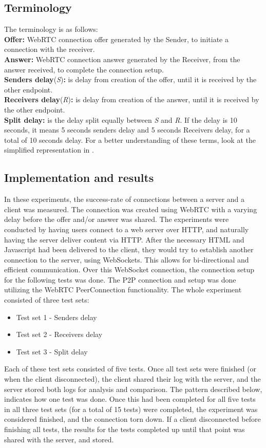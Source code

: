 \subsection{Terminology}
%
The terminology is as follows:\\
{\bfseries Offer:} WebRTC connection offer generated by the Sender, to initiate a connection with the receiver.\\
{\bfseries Answer:} WebRTC connection answer generated by the Receiver, from the answer received, to complete the connection setup.\\
{\bfseries Senders delay}(\textit{S}){\bfseries :} is delay from creation of the offer, until it is received by the other endpoint.\\
{\bfseries Receivers delay}(\textit{R}){\bfseries :} is delay from creation of the answer, until it is received by the other endpoint.\\
{\bfseries Split delay:} is the delay split equally between \textit{S} and \textit{R}. If the delay is 10 seconds, it means 5 seconds senders delay and 5 seconds Receivers delay, for a total of 10 seconds delay.
For a better understanding of these terms, look at the simplified representation in .
%
%
\subsection{Implementation and results}
In these experiments, the success-rate of connections between a server and a client was measured. The connection was created using WebRTC with a varying delay before the offer and/or answer was shared. The experiments were conducted by having users connect to a web server over HTTP, and naturally having the server deliver content via HTTP. After the necessary HTML and Javascript had been delivered to the client, they would try to establish another connection to the server, using WebSockets. This allows for bi-directional and efficient communication. 
Over this WebSocket connection, the connection setup for the following tests was done. The P2P connection and setup was done utilizing the WebRTC PeerConnection functionality. The whole experiment consisted of three test sets:
%
\begin{itemize}
	\item Test set 1 - Senders delay
	\item Test set 2 - Receivers delay
	\item Test set 3 - Split delay
\end{itemize}
%
Each of these test sets consisted of five tests. Once all test sets were finished (or when the client disconnected), the client shared their log with the server, and the server stored both logs for analysis and comparison. The pattern described below, indicates how one test was done. Once this had been completed for all five tests in all three test sets (for a total of 15 tests) were completed, the experiment was considered finished, and the connection torn down. If a client disconnected before finishing all tests, the results for the tests completed up until that point was shared with the server, and stored.

